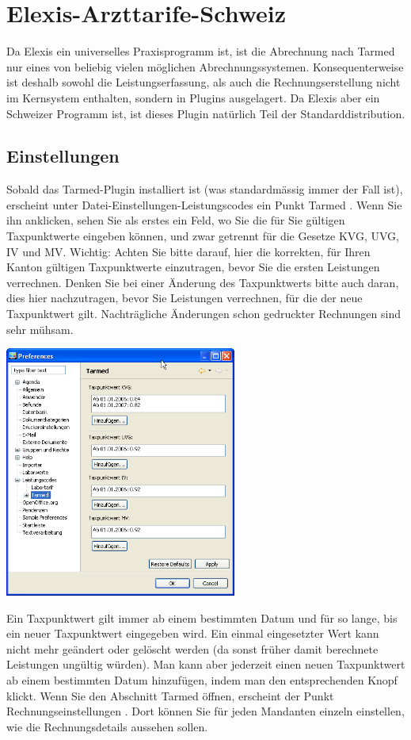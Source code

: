 \section{Elexis-Arzttarife-Schweiz}
Da Elexis ein universelles Praxisprogramm ist, ist die Abrechnung nach Tarmed nur eines von beliebig vielen
möglichen Abrechnungssystemen. Konsequenterweise ist deshalb sowohl die Leistungserfassung, als auch die
Rechnungserstellung nicht im Kernsystem enthalten, sondern in Plugins ausgelagert.
Da Elexis aber ein Schweizer Programm ist, ist dieses Plugin natürlich Teil der
Standarddistribution.
\subsection{Einstellungen}
Sobald das Tarmed-Plugin installiert ist (was standardmässig immer der Fall ist), erscheint unter
Datei-Einstellungen-Leistungscodes ein Punkt  Tarmed . Wenn Sie ihn anklicken, sehen Sie als erstes ein Feld,
wo Sie die für Sie gültigen Taxpunktwerte eingeben können, und zwar getrennt für die Gesetze KVG, UVG, IV und MV.
Wichtig: Achten Sie bitte darauf, hier die korrekten, für Ihren Kanton gültigen Taxpunktwerte einzutragen,
bevor Sie die ersten Leistungen verrechnen. Denken Sie bei einer Änderung des Taxpunktwerts bitte auch daran,
dies hier nachzutragen, bevor Sie Leistungen verrechnen, für die der neue Taxpunktwert gilt. Nachträgliche
Änderungen schon gedruckter Rechnungen sind sehr mühsam.

\includegraphics[width=3in]{images/tarmed1.png}

Ein Taxpunktwert gilt immer ab einem bestimmten Datum und für so lange, bis ein neuer Taxpunktwert eingegeben
wird. Ein einmal eingesetzter Wert kann nicht mehr geändert oder gelöscht werden (da sonst früher damit berechnete
Leistungen ungültig würden). Man kann aber jederzeit einen neuen Taxpunktwert ab einem bestimmten Datum hinzufügen,
 indem man den entsprechenden Knopf klickt.
Wenn Sie den Abschnitt Tarmed öffnen, erscheint der Punkt  Rechnungseinstellungen . Dort können Sie für jeden
Mandanten einzeln einstellen, wie die Rechnungsdetails aussehen sollen.

